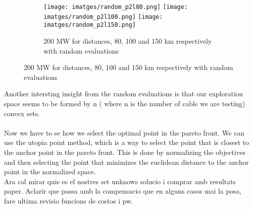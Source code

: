 \documentclass{article}
\begin{document}
\begin{figure}[h]
  \begin{subfigure}{\linewidth}
  \texttt{[image: imatges/random\_p2l80.png]}\hfill
  \texttt{[image: imatges/random\_p2l100.png]}\hfill
  \texttt{[image: imatges/random\_p2l150.png]}
  \caption{200 MW for distances, 80, 100 and 150 km respectively with random evaluations}
  \end{subfigure}\par\medskip
  
\end{figure}
Another intersting insight from the random evaluations is that our exploration space seems to
be formed by n ( where n is the number of cable we are testing) convex sets.
\\
\\
Now we have to se how we select the optimal point in the pareto front. We can use the utopia point method,
which is a way to select the point that is closest to the anchor point in the pareto front. This is done
by normalizing the objectives and then selecting the point that minimizes the euclidean distance to the anchor point
in the normalized space.\\

Ara cal mirar quis es el nostres set unknows solucio i comprar amb resultats paper. Aclarir que passa amb la compensacio que en alguns
casos mai la posa, fare ultima revisio funcions de costos i pw.
  
\end{document}
